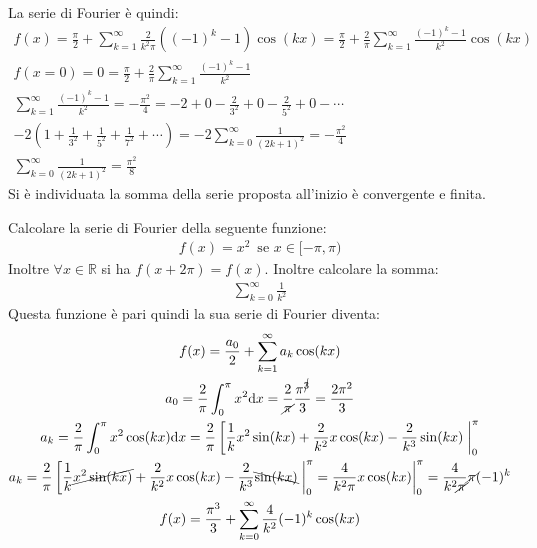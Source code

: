 \documentclass{article}
\newcommand{\df}{\mathrm{d}}
\numberwithin{equation}{subsection}
\begin{document}
La serie di Fourier è quindi:
\begin{gather*}
    f(x)=\displaystyle\frac{\pi}{2}+\sum_{k=1}^\infty\frac{2}{k^2\pi}\left((-1)^{k}-1\right)\cos(kx)=\frac{\pi}{2}+\frac{2}{\pi}\sum_{k=1}^\infty\frac{(-1)^{k}-1}{k^2}\cos(kx)\\
    f(x=0)=0=\displaystyle\frac{\pi}{2}+\frac{2}{\pi}\sum_{k=1}^\infty\frac{(-1)^{k}-1}{k^2}\\
    \displaystyle\sum_{k=1}^\infty\frac{(-1)^{k}-1}{k^2}=-\frac{\pi^2}{4}=-2+0-\frac{2}{3^2}+0-\frac{2}{5^2}+0-\cdots\\
    -2\left(1+\displaystyle\frac{1}{3^2}+\frac{1}{5^2}+\frac{1}{7^2}+\cdots\right)=-2\sum_{k=0}^\infty\frac{1}{(2k+1)^2}=-\frac{\pi^2}{4}\\
    \displaystyle\sum_{k=0}^\infty\frac{1}{(2k+1)^2}=\frac{\pi^2}{8}
\end{gather*}
Si è individuata la somma della serie proposta all'inizio è convergente e finita. 



Calcolare la serie di Fourier della seguente funzione:
\begin{gather*}
    f(x)=x^2\,\mbox{ se } x\in[-\pi,\pi)
\end{gather*}
Inoltre $\forall x\in\mathbb{R}$ si ha $f(x+2\pi)=f(x)$. Inoltre calcolare la somma:
\begin{gather*}
    \displaystyle\sum_{k=0}^\infty\frac{1}{k^2}%
\end{gather*}
Questa funzione è pari quindi la sua serie di Fourier diventa:
\begin{gather*}
    f(x)=\displaystyle\frac{a_0}{2}+\sum_{k=1}^\infty a_k\cos(kx)\\
    a_0=\displaystyle\frac{2}{\pi}\int_0^\pi x^2\df x=\frac{2}{\cancel{\pi}}\frac{\pi^{\cancel{3}}}{3}=\frac{2\pi^2}{3}\\
    a_k=\displaystyle\frac{2}{\pi}\int_0^\pi x^2\cos(kx)\df x=\frac{2}{\pi}\left[\frac{1}{k}x^2\sin(kx)+\frac{2}{k^2}x\cos(kx)-\frac{2}{k^3}\sin(kx)\right.\bigg|_0^\pi\\
    a_k=\frac{2}{\pi}\left[\frac{1}{k}\cancel{x^2\sin(kx)}+\frac{2}{k^2}x\cos(kx)-\frac{2}{k^3}\bcancel{\sin(kx)}\right.\bigg|_0^\pi=\frac{4}{k^2\pi}x\cos(kx)\bigg|_0^\pi=\frac{4}{k^2\cancel{\pi}}\cancel{\pi}(-1)^k\\
    f(x)=\frac{\pi^3}{3}+\sum_{k=0}^\infty\frac{4}{k^2}(-1)^k\cos(kx)
\end{gather*}
\end{document}
